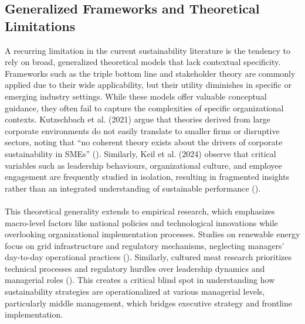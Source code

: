 	\subsection{Generalized Frameworks and Theoretical Limitations}
	A recurring limitation in the current sustainability literature is the tendency to rely on broad, generalized theoretical models that lack contextual specificity. Frameworks such as the triple bottom line and stakeholder theory are commonly applied due to their wide applicability, but their utility diminishes in specific or emerging industry settings. While these models offer valuable conceptual guidance, they often fail to capture the complexities of specific organizational contexts. Kutzschbach et al. (2021) argue that theories derived from large corporate environments do not easily translate to smaller firms or disruptive sectors, noting that “no coherent theory exists about the drivers of corporate sustainability in SMEs” (\textcite{kutzschbach2021a}). Similarly, Keil et al. (2024) observe that critical variables such as leadership behaviours, organizational culture, and employee engagement are frequently studied in isolation, resulting in fragmented insights rather than an integrated understanding of sustainable performance (\textcite{keil2024a}). 

	\paragraph*{} This theoretical generality extends to empirical research, which emphasizes macro-level factors like national policies and technological innovations while overlooking organizational implementation processes. Studies on renewable energy focus on grid infrastructure and regulatory mechanisms, neglecting managers’ day-to-day operational practices (\textcite{IRENA2020}). Similarly, cultured meat research prioritizes technical processes and regulatory hurdles over leadership dynamics and managerial roles (\textcite{Bryant2020}). This creates a critical blind spot in understanding how sustainability strategies are operationalized at various managerial levels, particularly middle management, which bridges executive strategy and frontline implementation.
	
